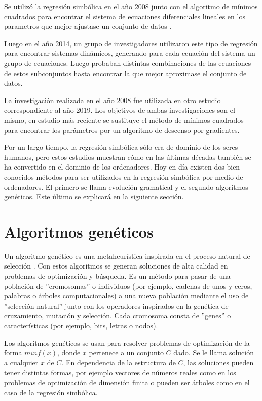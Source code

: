 Se utilizó la regresión simbólica en el año 2008 junto con el algoritmo de mínimos cuadrados para encontrar el sistema de ecuaciones diferenciales lineales en los parametros que mejor ajustase un conjunto de datos \cite{iba2008inference}.

Luego en el año 2014, un grupo de investigadores utilizaron este tipo de regresión para encontrar sistemas dinámicos, generando para cada ecuación del sistema un grupo de ecuaciones. Luego probaban distintas combinaciones de las ecuaciones de estos subconjuntos hasta encontrar la que mejor aproximase el conjunto de datos. \cite{gaucel2014learning}

La investigación realizada en el año 2008 fue utilizada en otro estudio correspondiente al año 2019. Los objetivos de ambas investigaciones son el mismo, en estudio más reciente se sustituye el método de mínimos cuadrados para encontrar los parámetros por un algoritmo de descenso por gradientes. \cite{kronberger2019identification}

Por un largo tiempo, la regresión simbólica sólo era de dominio de los seres humanos, pero estos estudios muestran cómo en las últimas décadas también se ha convertido en el dominio de los ordenadores. Hoy en día existen dos bien conocidos métodos para ser utilizados en la regresión simbólica por medio de ordenadores. El primero se llama evolución gramatical y el segundo algoritmos genéticos. \cite{zelinka2005analytic} Este último se explicará en la siguiente sección.

\section{Algoritmos genéticos}

Un algoritmo genético es una metaheurística inspirada en el proceso natural de selección \cite{mitchell1998introduction}. Con estos algoritmos se generan soluciones de alta calidad en problemas de optimización y búsqueda. Es un método para pasar de una población de ''cromosomas'' o individuos (por ejemplo, cadenas de unos y ceros, palabras o árboles computacionales) a una nueva población mediante el uso de ''selección natural'' junto con los operadores inspirados en la genética de cruzamiento, mutación y selección. Cada cromosoma consta de ''genes'' o características (por ejemplo, bits, letras o nodos).

Los algoritmos genéticos se usan para resolver problemas de optimización de la forma $min f(x)$, donde $x$ pertenece a un conjunto $C$ dado. Se le llama solución a cualquier $x$ de $C$. En dependencia de la estructura de $C$, las soluciones pueden tener distintas formas, por ejemplo vectores de números reales como en los problemas de optimización de dimensión finita o pueden ser árboles como en el caso de la regresión simbólica.

